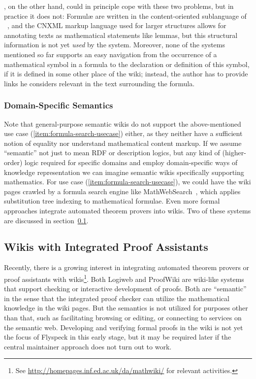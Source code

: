 , on the other hand, could in principle cope with these two problems,
but in practice it does not: Formulæ are written in the content-oriented sublanguage of
{\mathml}~\cite{CarlisleEd:MathML07}, and the CNXML markup language used for larger
structures allows for annotating texts as mathematical statements like lemmas, but this
structural information is not yet \emph{used} by the system.  Moreover, none of the
systems mentioned so far supports an easy navigation from the occurrence of a mathematical
symbol in a formula to the declaration or definition of this symbol, if it is defined in
some other place of the wiki; instead, the author has to provide links he considers
relevant in the text surrounding the formula.

\subsubsection{Domain-Specific Semantics}
\label{sec:domain-semantics}

Note that general-purpose semantic wikis do not support the above-mentioned use case
(\ref{item:formula-search-usecase}) either, as they neither have a sufficient notion of
equality nor understand mathematical content markup.  If we assume ``semantic'' not just
to mean RDF or description logics, but any kind of (higher-order) logic required for
specific domains and employ domain-specific ways of knowledge representation we can
imagine semantic wikis specifically supporting mathematics.  For use case
(\ref{item:formula-search-usecase}), we could have the wiki pages crawled by a formula
search engine like MathWebSearch~\cite{KohSuc:asemf06}, which applies substitution tree
indexing to mathematical formulae.  Even more formal approaches integrate automated
theorem provers into wikis.  Two of these systems are discussed in
section~\ref{sec:wiki-pa}.


\subsection{Wikis with Integrated Proof Assistants}
\label{sec:wiki-pa}

Recently, there is a growing interest in integrating automated theorem provers or proof
assistants with wikis\footnote{See \url{http://homepages.inf.ed.ac.uk/da/mathwiki/} for
  relevant activities.}.  Both Logiweb and ProofWiki are wiki-like systems that support
checking or interactive development of proofs.  Both are ``semantic'' in the sense that
the integrated proof checker can utilize the mathematical knowledge in the wiki pages.
But the semantics is not utilized for purposes other than that, such as facilitating
browsing or editing, or connecting to services on the semantic web.  Developing and
verifying formal proofs in the wiki is not yet the focus of Flyspeck in this early stage,
but it may be required later if the central maintainer approach does not turn out to work.


